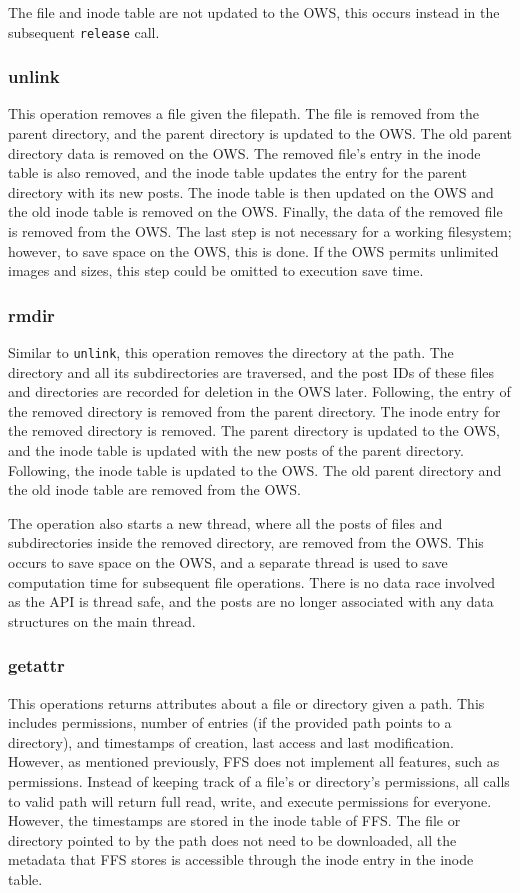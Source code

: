 The file and inode table are not updated to the OWS, this occurs instead in the subsequent \texttt{release} call.

\subsubsection{unlink}
This operation removes a file given the filepath. The file is removed from the parent directory, and the parent directory is updated to the OWS. The old parent directory data is removed on the OWS. The removed file's entry in the inode table is also removed, and the inode table updates the entry for the parent directory with its new posts. The inode table is then updated on the OWS and the old inode table is removed on the OWS. Finally, the data of the removed file is removed from the OWS. The last step is not necessary for a working filesystem; however, to save space on the OWS, this is done. If the OWS permits unlimited images and sizes, this step could be omitted to execution save time.

\subsubsection{rmdir}
Similar to \texttt{unlink}, this operation removes the directory at the path. The directory and all its subdirectories are traversed, and the post IDs of these files and directories are recorded for deletion in the OWS later. Following, the entry of the removed directory is removed from the parent directory. The inode entry for the removed directory is removed. The parent directory is updated to the OWS, and the inode table is updated with the new posts of the parent directory. Following, the inode table is updated to the OWS. The old parent directory and the old inode table are removed from the OWS.

The operation also starts a new thread, where all the posts of files and subdirectories inside the removed directory, are removed from the OWS. This occurs to save space on the OWS, and a separate thread is used to save computation time for subsequent file operations. There is no data race involved as the API is thread safe, and the posts are no longer associated with any data structures on the main thread.

\subsubsection{getattr}
This operations returns attributes about a file or directory given a path. This includes permissions, number of entries (if the provided path points to a directory), and timestamps of creation, last access and last modification. However, as mentioned previously, FFS does not implement all features, such as permissions. Instead of keeping track of a file's or directory's permissions, all calls to valid path will return full read, write, and execute permissions for everyone. However, the timestamps are stored in the inode table of FFS. The file or directory pointed to by the path does not need to be downloaded, all the metadata that FFS stores is accessible through the inode entry in the inode table.

